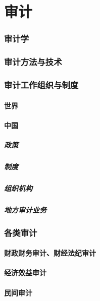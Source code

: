 \documentclass[UTF8]{../../RepresentationUniverse}
\begin{document}
\chapter{审计}
\subsection{审计学}
\subsection{审计方法与技术}
\subsection{审计工作组织与制度}
    \subsubsection{世界}
    \subsubsection{中国}
        \paragraph{政策}
        \paragraph{制度}
        \paragraph{组织机构}
        \paragraph{地方审计业务}
\subsection{各类审计}
    \subsubsection{财政财务审计、财经法纪审计}
    \subsubsection{经济效益审计}
    \subsubsection{民间审计}
\end{document}
